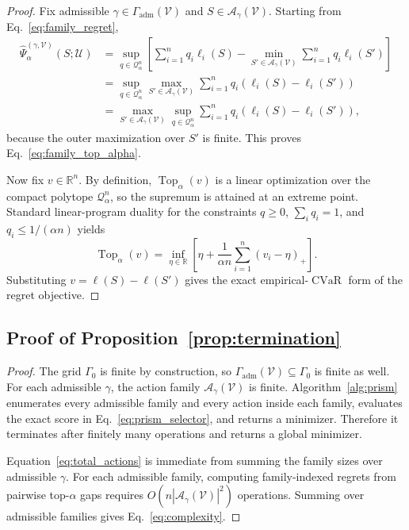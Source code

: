 \documentclass{article}
\newcommand{\RR}{\mathbb{R}}
\newcommand{\cA}{\mathcal{A}}
\newcommand{\cQ}{\mathcal{Q}}
\newcommand{\cU}{\mathcal{U}}
\newcommand{\cV}{\mathcal{V}}
\newcommand{\CVaR}{\operatorname{CVaR}}
\newcommand{\Top}{\operatorname{Top}}
\newcommand{\paren}[1]{\left( #1 \right)}
\newcommand{\loss}{\ell}
\newcommand{\1}{\mathbbm{1}}
\begin{document}
\begin{proof}
Fix admissible \(\gamma\in\Gamma_{\mathrm{adm}}(\cV)\) and \(S\in\cA_\gamma(\cV)\). Starting from Eq.~\eqref{eq:family_regret},
\begin{align}
    \widehat{\Psi}^{(\gamma,\cV)}_\alpha(S;\cU)
    &=
    \sup_{q\in\cQ_\alpha^n}
    \left[
        \sum_{i=1}^{n} q_i \loss_i(S)
        -
        \min_{S'\in\cA_\gamma(\cV)}
        \sum_{i=1}^{n} q_i \loss_i(S')
    \right]
    \nonumber\\
    &=
    \sup_{q\in\cQ_\alpha^n}
    \max_{S'\in\cA_\gamma(\cV)}
    \sum_{i=1}^{n} q_i\paren{\loss_i(S)-\loss_i(S')}
    \nonumber\\
    &=
    \max_{S'\in\cA_\gamma(\cV)}
    \sup_{q\in\cQ_\alpha^n}
    \sum_{i=1}^{n} q_i\paren{\loss_i(S)-\loss_i(S')},
    \label{eq:proof_swap}
\end{align}
because the outer maximization over \(S'\) is finite. This proves Eq.~\eqref{eq:family_top_alpha}.

Now fix \(v\in\RR^n\). By definition, \(\Top_\alpha(v)\) is a linear optimization over the compact polytope \(\cQ_\alpha^n\), so the supremum is attained at an extreme point. Standard linear-program duality for the constraints \(q\ge 0\), \(\sum_i q_i=1\), and \(q_i\le 1/(\alpha n)\) yields
\[
    \Top_\alpha(v)
    =
    \inf_{\eta\in\RR}
    \left[
        \eta + \frac{1}{\alpha n}\sum_{i=1}^{n}(v_i-\eta)_+
    \right].
\]
Substituting \(v=\loss(S)-\loss(S')\) gives the exact empirical-\(\CVaR\) form of the regret objective.
\end{proof}

\subsection{Proof of Proposition~\ref{prop:termination}}

\begin{proof}
The grid \(\Gamma_0\) is finite by construction, so \(\Gamma_{\mathrm{adm}}(\cV)\subseteq\Gamma_0\) is finite as well. For each admissible \(\gamma\), the action family \(\cA_\gamma(\cV)\) is finite. Algorithm~\ref{alg:prism} enumerates every admissible family and every action inside each family, evaluates the exact score in Eq.~\eqref{eq:prism_selector}, and returns a minimizer. Therefore it terminates after finitely many operations and returns a global minimizer.

Equation~\eqref{eq:total_actions} is immediate from summing the family sizes over admissible \(\gamma\). For each admissible family, computing family-indexed regrets from pairwise top-\(\alpha\) gaps requires \(O(n|\cA_\gamma(\cV)|^2)\) operations. Summing over admissible families gives Eq.~\eqref{eq:complexity}.
\end{proof}
\end{document}
